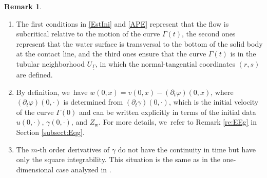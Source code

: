 \documentclass[11pt]{article}
\newcommand{\skpt}{\smallskip}
\newenvironment{enumeratei}
{\bgroup\def\theenumi{\roman{enumi}}\def\theenumii{\arabic{enumii}}\begin{enumerate}}
{\end{enumerate}\egroup}
\newcommand{\dt}{\partial_t}
\newcommand{\ul}[1]{\underline{#1}}
\newcommand{\itGamma}{\mathit{\Gamma}}
\theoremstyle{definition}
\newtheorem{remark}[theorem]{Remark}
\begin{document}
\skpt
\begin{remark}\label{re:th}
\begin{enumeratei}
\item
The first conditions in \eqref{EstIni} and \eqref{APE} represent that the flow is subcritical relative to the motion of the curve $\itGamma(t)$,
the second ones represent that the water surface is transversal to the bottom of the solid body at the contact line,
and the third ones ensure that the curve $\itGamma(t)$ is in the tubular neighborhood $U_{\ul{\itGamma}}$,
in which the normal-tangential coordinates $(r,s)$ are defined.

\item
By definition, we~have $w(0,x)=v(0,x)-(\dt\varphi)(0,x)$, where $(\dt\varphi)(0,\cdot)$ is determined from $(\dt\gamma)(0,\cdot)$,
which is the initial velocity of the curve $\itGamma(0)$ and can be written explicitly in terms of the initial data
$u(0,\cdot)$, $\gamma(0,\cdot)$, and $Z_\mathrm{w}$.
For more details, we~refer to Remark \ref{re:EEg} in Section \ref{subsect:Eqg}.

\item
The $m$-th order derivatives of $\gamma$ do not have the continuity in time but have only the square integrability.
This situation is the same as in the one-dimensional case analyzed in \cite{IguchiLannes2021}.
\end{enumeratei}
\end{remark}
\end{document}
